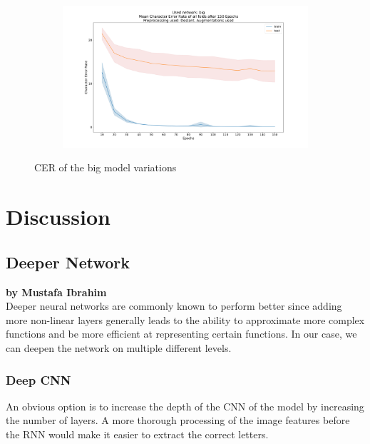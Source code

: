 \documentclass{article}
\begin{document}
\begin{figure}[H]
\begin{adjustwidth}{-8em}{-8em}
\begin{subfigure}{0.7\textwidth}
    \end{subfigure}
    \begin{subfigure}{0.7\textwidth}
        \centering
        \includegraphics[width=\textwidth]{Deslant_big_150_augmentations_cer}
    \end{subfigure}
    \end{adjustwidth}
\caption{CER of the big model variations}

\label{fig:CERBig}
\end{figure}

\newpage
\section{Discussion}
\subsection{Deeper Network}

\textbf{by Mustafa Ibrahim} \\

Deeper neural networks are commonly known to perform better since adding more non-linear layers generally leads to the ability to approximate more complex functions and be more efficient at representing certain functions\cite{Bengio}\cite{LeRoux}\cite{Delalleau}\cite{Pascanu1}. In our case, we can deepen the network on multiple different levels.
\subsubsection{Deep CNN}
An obvious option is to increase the depth of the CNN of the model by increasing the number of layers. A more thorough processing of the image features before the RNN would make it easier to extract the correct letters.
\end{document}
